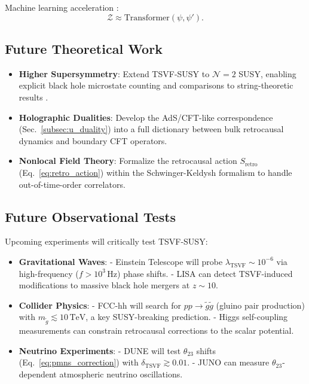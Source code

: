 \documentclass[twocolumn,superscriptaddress,floatfix]{revtex4-2}
\begin{document}
Machine learning acceleration \cite{George2023}:
\begin{equation}
\mathcal{Z} \approx \text{Transformer}(\psi, \psi').
\end{equation}

\subsection{Future Theoretical Work}  
\label{subsec:future_theory}  

\begin{itemize}  
\item \textbf{Higher Supersymmetry}: Extend TSVF-SUSY to \(\mathcal{N}=2\) SUSY, enabling explicit black hole microstate counting \cite{Strominger1996} and comparisons to string-theoretic results \cite{Sen2008}.  
\item \textbf{Holographic Dualities}: Develop the AdS/CFT-like correspondence (Sec.~\ref{subsec:u_duality}) into a full dictionary between bulk retrocausal dynamics and boundary CFT operators.  
\item \textbf{Nonlocal Field Theory}: Formalize the retrocausal action \(S_{\text{retro}}\) (Eq.~\ref{eq:retro_action}) within the Schwinger-Keldysh formalism \cite{Haehl2017} to handle out-of-time-order correlators.  
\end{itemize}  

\subsection{Future Observational Tests}  
\label{subsec:future_obs}  

Upcoming experiments will critically test TSVF-SUSY:  
\begin{itemize}  
\item \textbf{Gravitational Waves}:  
  - Einstein Telescope \cite{Punturo2010} will probe \(\lambda_{\text{TSVF}} \sim 10^{-6}\) via high-frequency (\(f > 10^3 \, \text{Hz}\)) phase shifts.  
  - LISA \cite{Amaro-Seoane2017} can detect TSVF-induced modifications to massive black hole mergers at \(z \sim 10\).  
\item \textbf{Collider Physics}:  
  - FCC-hh \cite{Abada2019} will search for \(pp \to \tilde{g}\tilde{g}\) (gluino pair production) with \(m_{\tilde{g}} \lesssim 10 \, \text{TeV}\), a key SUSY-breaking prediction.  
  - Higgs self-coupling measurements \cite{deBlas2020} can constrain retrocausal corrections to the scalar potential.  
\item \textbf{Neutrino Experiments}:  
  - DUNE \cite{Abi2021} will test \(\theta_{23}\) shifts (Eq.~\ref{eq:pmns_correction}) with \(\delta_{\text{TSVF}} \gtrsim 0.01\).  
  - JUNO \cite{An2016} can measure \(\theta_{23}\)-dependent atmospheric neutrino oscillations.  
\end{itemize}  
\end{document}
